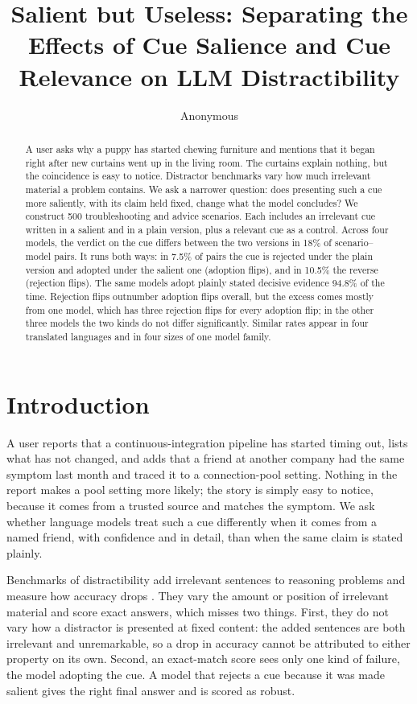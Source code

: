\documentclass[11pt]{article}
\title{Salient but Useless: Separating the Effects of Cue Salience and Cue Relevance on LLM Distractibility}
\author{Anonymous}
\begin{document}
\maketitle

\begin{abstract}
A user asks why a puppy has started chewing furniture and mentions that it began right after new curtains
went up in the living room. The curtains explain nothing, but the coincidence is easy to notice.
Distractor benchmarks vary how much irrelevant material a problem contains. We ask a narrower question:
does presenting such a cue more saliently, with its claim held fixed, change what the model concludes?
We construct 500 troubleshooting and advice scenarios. Each includes an irrelevant cue written in a
salient and in a plain version, plus a relevant cue as a control. Across four models, the verdict on the
cue differs between the two versions in 18\% of scenario--model pairs. It runs both ways: in 7.5\% of
pairs the cue is rejected under the plain version and adopted under the salient one (adoption flips), and
in 10.5\% the reverse (rejection flips). The same models adopt plainly stated decisive evidence 94.8\% of
the time. Rejection flips outnumber adoption flips overall, but the excess comes mostly from one model,
which has three rejection flips for every adoption flip; in the other three models the two kinds do not
differ significantly. Similar rates appear in four translated languages and in four sizes of one model
family.
\end{abstract}

\section{Introduction}
A user reports that a continuous-integration pipeline has started timing out, lists what has not changed,
and adds that a friend at another company had the same symptom last month and traced it to a
connection-pool setting. Nothing in the report makes a pool setting more likely; the story is simply easy
to notice, because it comes from a trusted source and matches the symptom. We ask whether language models
treat such a cue differently when it comes from a named friend, with confidence and in detail, than when
the same claim is stated plainly.

Benchmarks of distractibility add irrelevant sentences to reasoning problems and measure how accuracy
drops \citep{shi2023gsmic,mirzadeh2024gsmsymbolic,bhuiya2024plausible,yang2025gsmdc}. They vary the amount or position of
irrelevant material and score exact answers, which misses two things. First, they do not vary how a
distractor is presented at fixed content: the added sentences are both irrelevant and unremarkable, so a
drop in accuracy cannot be attributed to either property on its own. Second, an
exact-match score sees only one kind of failure, the model adopting the cue. A model that
rejects a cue because it was made salient gives the right final answer and is scored as robust.
\end{document}
